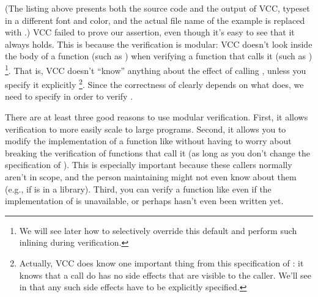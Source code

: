 
(The listing above presents both the source code and the output
of VCC, typeset in a different font and color, and 
the actual file name of the example is replaced with .)
VCC failed to prove our assertion, even though it's easy to see that
it always holds. This is because the verification is modular: VCC
doesn't look inside the body of a function (such as ) 
when verifying a function that calls it (such as )%
\footnote{We will see later how to selectively override this default
  and perform such inlining during verification.}.  
That is, VCC doesn't ``know'' anything about the effect of calling 
, unless you specify it explicitly%
\footnote{
  Actually, VCC does know one important thing from this specification
  of : it knows that a call do  has no side
  effects that are visible to the caller. We'll see in  that
  any such side effects have to be explicitly specified.
}.
Since the correctness of  clearly depends on what 
does, we need to specify  in order to verify .

\begin{note}
There are at least three good reasons to use modular
verification. First, it allows verification to more easily scale to
large programs. Second, it allows you to modify the implementation of
a function like  without having to worry about breaking the
verification of functions that call it (as long as you don't change
the specification of ). This is especially important
because these callers normally aren't in scope, and the person
maintaining  might not even know about them (e.g., if
 is in a library). Third, you can verify a function like
 even if the implementation of  is unavailable, or
perhaps hasn't even been written yet. 
\end{note}

